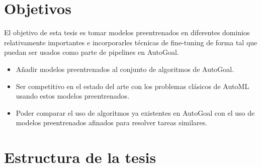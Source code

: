 \section*{Objetivos}
El objetivo de esta tesis es tomar modelos preentrenados en diferentes dominios relativamente importantes e incorporarles técnicas de fine-tuning de forma tal que puedan ser usados como parte de pipelines en AutoGoal.\\

\begin{itemize}

\item Añadir modelos preentrenados al conjunto de algoritmos de AutoGoal.
\item Ser competitivo en el estado del arte con los problemas clásicos de AutoML usando estos modelos preentrenados.
\item Poder comparar el uso de algoritmos ya existentes en AutoGoal con el uso de modelos preentrenados afinados para resolver tareas similares.

\end{itemize}

\section*{Estructura de la tesis}

